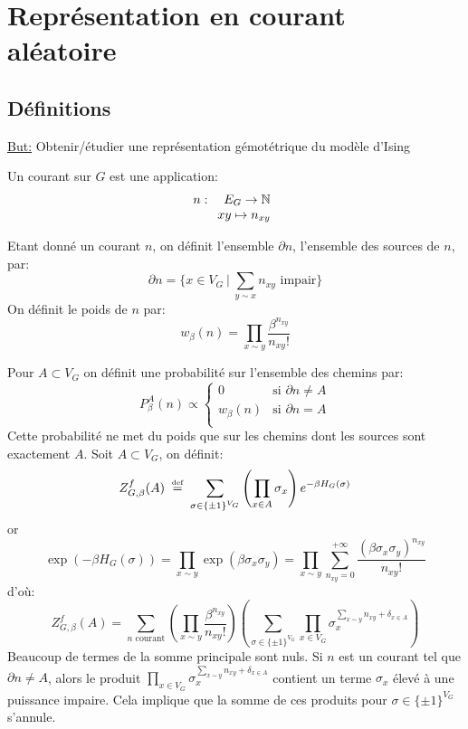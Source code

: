 \documentclass[a4paper,12pt]{report}
\newcommand\eqdef{\mathrel{\stackrel{\makebox[0pt]{\mbox{\normalfont\tiny def}}}{=}}}
\begin{document}
\newpage
\section{Représentation en courant aléatoire}
\subsection{Définitions}
\underline{But:} Obtenir/étudier une représentation gémotétrique du modèle d'Ising

\begin{defi}[Courant]
Un courant sur $G$ est une application: 
$$n :\begin{array}[t]{rcl} E_G \rightarrow \mathbb{N} \\ xy \mapsto n_{xy} \end{array}$$
\end{defi}

Etant donné un courant $n$, on définit l'ensemble $\partial n$, l'ensemble des sources de $n$, par:
$$
\partial n = \Big\lbrace x \in V_G \ \vert \ \sum_{y \sim x} n_{xy} \text{ impair} \Big\rbrace
$$
On définit le poids de $n$ par:
$$
w_{\beta}(n) = \prod_{x \sim y} \frac{\beta^{n_{xy}}}{n_{xy}!}
$$

Pour $A \subset V_G$ on définit une probabilité sur l'ensemble des chemins par:
$$
P^A_{\beta}(n) \propto 
\begin{cases}
0 & \text{si } \partial n \neq A \\
w_{\beta}(n) & \text{si } \partial n = A \\
\end{cases}
$$
Cette probabilité ne met du poids que sur les chemins dont les sources sont exactement $A$.
Soit $A \subset V_G$, on définit:
$$
Z_{G,\beta}^f(A) \ \eqdef \ \sum_{\sigma \in \{ \pm 1 \}^{V_G} } \left( \prod_{x \in A} \sigma_x \right) e^{- \beta H_G(\sigma)}
$$
or
$$
\exp(-\beta H_G(\sigma)) = \prod_{x \sim y} \exp(\beta \sigma_x \sigma_y) = \prod_{x \sim y} \sum_{n_{xy}=0}^{+ \infty} \frac{(\beta \sigma_x \sigma_y)^{n_{xy}}}{n_{xy}!}
$$
d'où:
$$
Z_{G,\beta}^f(A) = \sum_{n \text{ courant}} \left( \prod_{x \sim y} \frac{\beta^{n_{xy}}}{n_{xy}!} \right) \left( \sum_{\sigma \in \{ \pm 1 \}^{V_G}} \prod_{x \in V_G} \sigma_x^{\sum_{x \sim y} n_{xy} + \delta_{x \in A}} \right)
$$
Beaucoup de termes de la somme principale sont nuls. Si $n$ est un courant tel que $\partial n \neq A$, alors le produit $\prod_{x \in V_G} \sigma_x^{\sum_{x \sim y} n_{xy} + \delta_{x \in A}}$ contient un terme $\sigma_x$ élevé à une puissance impaire. Cela implique que la somme de ces produits pour $\sigma \in \{ \pm 1 \}^{V_G}$ s'annule.
\newline
\end{document}
